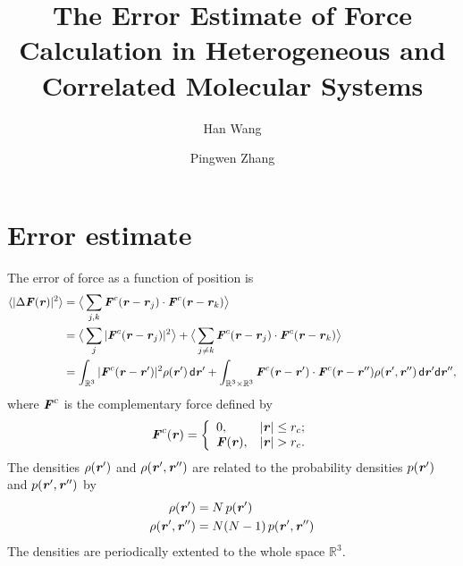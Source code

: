 \documentclass[aps,pre,preprint,unsortedaddress]{revtex4}
\renewcommand{\v}[1]{\textbf{\textit{#1}}}
\renewcommand{\d}[1]{\textsf{#1}}
\begin{document}
\title{The Error Estimate of Force Calculation in Heterogeneous and Correlated Molecular Systems}
\author{Han Wang}
\author{Pingwen Zhang}

\begin{abstract}
\end{abstract}

\maketitle


\section{Error estimate}
The error of force as a function of position is 
\begin{align} \nonumber
  \langle\vert\Delta\v F(\v r)\vert^2\rangle
  &= \big\langle\sum_{j,k}\v F^c(\v r - \v r_j)\cdot\v F^c(\v r - \v r_k)\big\rangle \\ \nonumber
  &= \big\langle\sum_j\vert\v F^c(\v r - \v r_j)\vert^2\big\rangle +
  \big\langle\sum_{j\neq k}\v F^c(\v r - \v r_j)\cdot\v F^c(\v r - \v r_k)\big\rangle \\ \label{eqn:tmp1}
  &= \int_{\mathbb R^3}\vert\v F^c(\v r - \v r')\vert^2\rho(\v r')\,\d d\v r'
  + \int_{\mathbb R^3\times\mathbb R^3}\v F^c(\v r - \v r')\cdot\v F^c(\v r - \v r'')\rho(\v r', \v r'')\,\d d\v r'\d d\v r'',
\end{align}
where $\v F^c$ is the complementary force defined by
\begin{align}
  \v F^c(\v r) =
  \left\{
  \begin{array}{ll}
    0, & \vert\v r\vert\leq r_c; \\
    \v F(\v r), & \vert\v r\vert > r_c.
  \end{array}
  \right.
\end{align}
The densities $\rho(\v r')$ and $\rho(\v r', \v r'')$ are related
to the probability densities $p(\v r')$ and $p(\v r', \v r'')$ by
\begin{align}
  \rho(\v r') &= N\,p(\v r') \\
  \rho(\v r', \v r'') &= N(N-1)\,p(\v r', \v r'')
\end{align}
The densities are periodically extented to the whole space $\mathbb
R^3$.
\end{document}

